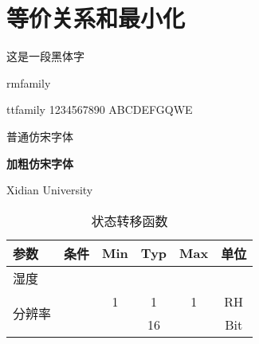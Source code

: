 \chapter{等价关系和最小化}

{\heiti 这是一段黑体字}

{\rmfamily rmfamily}

{\ttfamily ttfamily 1234567890 ABCDEFGQWE}

{\fangsong 普通仿宋字体}

{\fangsong\bfseries 加粗仿宋字体}

Xidian University

\begin{table}[!htbp]
    \caption{状态转移函数}
    \label{tab:sample2}
    \centering
    \small%
    \setlength{\tabcolsep}{4pt}%
    \renewcommand{\arraystretch}{1.2}%
    \begin{tabular}{l|c|c|c|c|c} 
        \hline
        参数 & 条件 & Min & Typ & Max & 单位 \\
        \hline
        \multicolumn{6}{l}{湿度} \\
        \hline
        \multirow{2}{*}{分辨率} & \multirow{2}{*}{ } & 1 & 1 & 1 & RH \\

        \cline{3-6}            &                    &   & 16 &  &  Bit \\
        \hline
    \end{tabular}
\end{table}